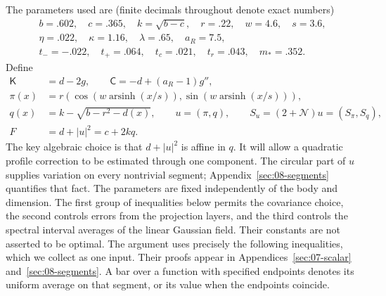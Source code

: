 The parameters used are (finite decimals throughout denote exact numbers)
\[
\begin{gathered}
 b=.602,\quad c=.365,\quad k=\sqrt{b-c},\quad r=.22,\quad w=4.6,\quad s=3.6,\\
 \eta=.022,\quad \kappa=1.16,\quad \lambda=.65,\quad a_R=7.5,\\
 t_-=-.022,\quad t_+=.064,\quad t_c=.021,\quad t_r=.043,\quad m_*=.352.
\end{gathered}
\]
Define
\[
\begin{aligned}
 \mathsf K&=d-2g,\qquad \mathsf C=-d+(a_R-1)g'',\\
 \pi(x)&=r(\cos(w\operatorname{arsinh}(x/s)),\sin(w\operatorname{arsinh}(x/s))),\\
 q(x)&=k-\sqrt{b-r^2-d(x)},\qquad u=(\pi,q),\qquad S_u=(2+\mathcal N)u=(S_\pi,S_q),\\
 F&=d+|u|^2=c+2kq.
\end{aligned}
\]
The key algebraic choice is that $d+|u|^2$ is affine in $q$.
It will allow a quadratic profile correction to be estimated through one
component. The circular part of $u$ supplies variation on every
nontrivial segment; Appendix~\ref{sec:08-segments} quantifies that fact.
The parameters are fixed independently of the body and dimension.
The first group of inequalities below permits the covariance choice,
the second controls errors from the projection layers, and the third
controls the spectral interval averages of the linear Gaussian field.
Their constants are not asserted to be optimal. The argument uses
precisely the following inequalities, which we collect as one input. Their proofs appear in Appendices~\ref{sec:07-scalar} and~\ref{sec:08-segments}. A bar over a function with specified endpoints denotes its uniform average on that segment, or its value when the endpoints coincide.

